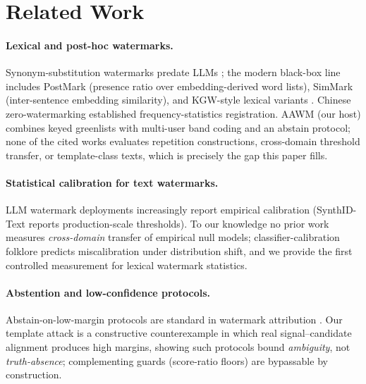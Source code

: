 \section{Related Work}

\paragraph{Lexical and post-hoc watermarks.}
Synonym-substitution watermarks predate LLMs \cite{topkara2006}; the modern
black-box line includes PostMark \cite{postmark} (presence ratio over
embedding-derived word lists), SimMark \cite{simmark} (inter-sentence embedding
similarity), and KGW-style lexical variants \cite{kgw}. Chinese
zero-watermarking \cite{wang2009} established frequency-statistics
registration. AAWM \cite{aawm} (our host) combines keyed greenlists with
multi-user band coding and an abstain protocol; none of the cited works
evaluates repetition constructions, cross-domain threshold transfer, or
template-class texts, which is precisely the gap this paper fills.

\paragraph{Statistical calibration for text watermarks.}
LLM watermark deployments increasingly report empirical calibration
(SynthID-Text \cite{synthid} reports production-scale thresholds). To our
knowledge no prior work measures \emph{cross-domain} transfer of empirical
null models; classifier-calibration folklore predicts miscalibration under
distribution shift, and we provide the first controlled measurement for
lexical watermark statistics.

\paragraph{Abstention and low-confidence protocols.}
Abstain-on-low-margin protocols are standard in watermark attribution
\cite{aawm,stealthink}. Our template attack is a constructive
counterexample in which real signal--candidate alignment produces high
margins, showing such protocols bound \emph{ambiguity}, not
\emph{truth-absence}; complementing guards (score-ratio floors) are
bypassable by construction.
